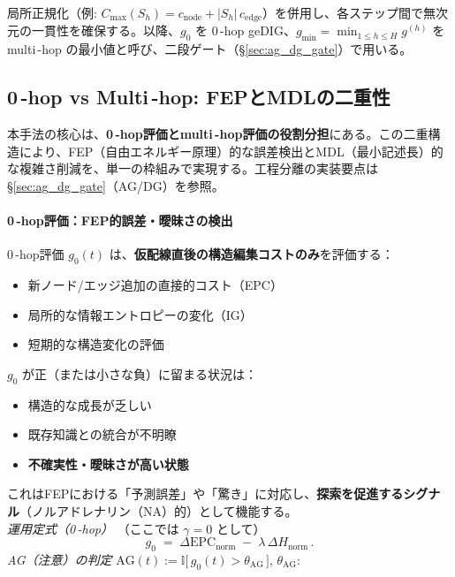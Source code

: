 \documentclass[ja=standard,xelatex]{bxjsarticle}
\begin{document}
局所正規化（例: $C_{\max}(S_h)=c_{\mathrm{node}}+|S_h|\,c_{\mathrm{edge}}$）を併用し、各ステップ間で無次元の一貫性を確保する。以降、$g_0$ を 0\,\mbox{-}hop geDIG、$g_{\min}=\min_{1\le h\le H} g^{(h)}$ を multi\,\mbox{-}hop の最小値と呼び、二段ゲート（\S\ref{sec:ag_dg_gate}）で用いる。

\subsection{0\,\mbox{-}hop vs Multi\,\mbox{-}hop: FEPとMDLの二重性}
\label{sec:dual_fep_mdl}
\label{sec:hop_duality}

本手法の核心は、\textbf{0\,\mbox{-}hop評価とmulti\,\mbox{-}hop評価の役割分担}にある。この二重構造により、FEP（自由エネルギー原理）的な誤差検出とMDL（最小記述長）的な複雑さ削減を、単一の枠組みで実現する。工程分離の実装要点は \S\ref{sec:ag_dg_gate}（AG/DG）を参照。

\paragraph{0\,\mbox{-}hop評価：FEP的誤差・曖昧さの検出}
0\,\mbox{-}hop評価 $g_0(t)$ は、\textbf{仮配線直後の構造編集コストのみ}を評価する：
\begin{itemize}
  \item 新ノード/エッジ追加の直接的コスト（EPC）
  \item 局所的な情報エントロピーの変化（IG）
  \item 短期的な構造変化の評価
\end{itemize}

$g_0$ が正（または小さな負）に留まる状況は：
\begin{itemize}
  \item 構造的な成長が乏しい
  \item 既存知識との統合が不明瞭
  \item \textbf{不確実性・曖昧さが高い状態}
\end{itemize}

これはFEPにおける「予測誤差」や「驚き」に対応し、\textbf{探索を促進するシグナル}（ノルアドレナリン（NA）的）として機能する。
\\[0.2em]
\textit{運用定式（0\,\mbox{-}hop）}\; （ここでは $\gamma{=}0$ として）
\begin{equation}
  g_0\;=\;\Delta\mathrm{EPC}_{\mathrm{norm}}\; -\; \lambda\,\Delta H_{\mathrm{norm}}\,.
  \label{eq:g0_runtime}
\end{equation}
\noindent \textit{AG（注意）の判定}\; \quad $\mathrm{AG}(t) := \mathbb{I}\big[\, g_0(t) > \theta_{\mathrm{AG}}\,\big]$, \;\; $\theta_{\mathrm{AG}}$:\,
\end{document}
